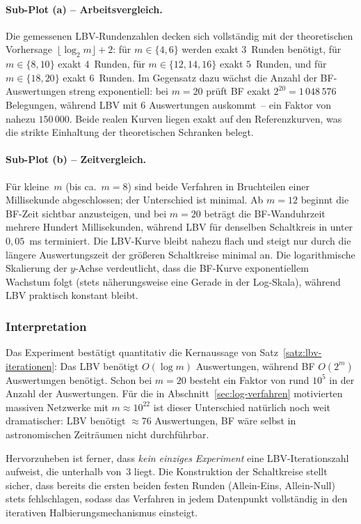 ﻿\documentclass[a4paper,12pt]{article}
\theoremstyle{definition}
\begin{document}
\paragraph{Sub-Plot (a) -- Arbeitsvergleich.}
Die gemessenen LBV-Rundenzahlen decken sich vollständig mit der theoretischen
Vorhersage~$\lfloor\log_2 m\rfloor + 2$: für $m \in \{4,6\}$ werden exakt
$3$~Runden benötigt, für $m \in \{8,10\}$ exakt $4$~Runden, für
$m \in \{12,14,16\}$ exakt $5$~Runden, und für $m \in \{18,20\}$ exakt
$6$~Runden.  Im Gegensatz dazu wächst die Anzahl der BF-Auswertungen streng
exponentiell: bei $m = 20$ prüft BF exakt $2^{20} = 1\,048\,576$ Belegungen,
während LBV mit 6 Auswertungen auskommt~-- ein Faktor von nahezu $150\,000$.
Beide realen Kurven liegen exakt auf den Referenzkurven, was die strikte
Einhaltung der theoretischen Schranken belegt.

\paragraph{Sub-Plot (b) -- Zeitvergleich.}
Für kleine~$m$ (bis ca.\ $m = 8$) sind beide Verfahren in Bruchteilen einer
Millisekunde abgeschlossen; der Unterschied ist minimal.  Ab $m = 12$ beginnt
die BF-Zeit sichtbar anzusteigen, und bei $m = 20$ beträgt die BF-Wanduhrzeit
mehrere Hundert Millisekunden, während LBV für denselben Schaltkreis in
unter $0{,}05$~ms terminiert.  Die LBV-Kurve bleibt nahezu flach und steigt
nur durch die längere Auswertungszeit der größeren Schaltkreise minimal an.
Die logarithmische Skalierung der $y$-Achse verdeutlicht, dass die BF-Kurve
exponentiellem Wachstum folgt (stets näherungsweise eine Gerade in der Log-Skala),
während LBV praktisch konstant bleibt.

\subsubsection{Interpretation}

Das Experiment bestätigt quantitativ die Kernaussage von
Satz~\ref{satz:lbv-iterationen}: Das LBV benötigt $O(\log m)$ Auswertungen,
während BF $O(2^m)$ Auswertungen benötigt.  Schon bei $m = 20$ besteht ein
Faktor von rund $10^5$ in der Anzahl der Auswertungen.  Für die in
Abschnitt~\ref{sec:log-verfahren} motivierten massiven Netzwerke mit
$m \approx 10^{22}$ ist dieser Unterschied natürlich noch weit dramatischer:
LBV benötigt $\approx 76$ Auswertungen, BF wäre selbst in astronomischen
Zeiträumen nicht durchführbar.

Hervorzuheben ist ferner, dass \emph{kein einziges Experiment} eine LBV-Iterationszahl
aufweist, die unterhalb von~$3$ liegt.  Die Konstruktion der Schaltkreise stellt
sicher, dass bereits die ersten beiden festen Runden (Allein-Eins, Allein-Null)
stets fehlschlagen, sodass das Verfahren in jedem Datenpunkt vollständig in den
iterativen Halbierungsmechanismus einsteigt.
\end{document}
